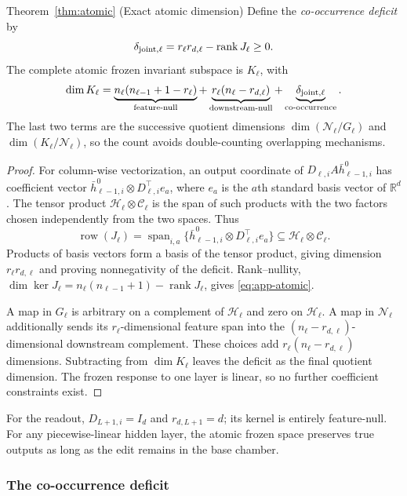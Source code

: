\documentclass[twoside]{article}
\theoremstyle{remark}
\DeclareMathOperator{\rank}{rank}
\DeclareMathOperator{\spanop}{span}
\newcommand{\R}{\mathbb R}
\newcommand{\cC}{\mathcal C}
\newcommand{\cH}{\mathcal H}
\theoremstyle{highlightdefinition}
\theoremstyle{remark}
\newcommand{\spn}{\spanop}
\begin{document}
\begin{restated}{Theorem~\ref{thm:atomic} (Exact atomic dimension)}
Define the \emph{co-occurrence deficit} by
\[
 \delta_{\rm joint,\ell}=r_\ell r_{d,\ell}-\rank J_\ell\ge0.
\]
The complete atomic frozen invariant subspace is $K_\ell$, with
\begin{equation}
 \dim K_\ell=\underbrace{n_\ell(n_{\ell-1}+1-r_\ell)}_{\text{feature-null}}
 +\underbrace{r_\ell(n_\ell-r_{d,\ell})}_{\text{downstream-null}}
 +\underbrace{\delta_{\rm joint,\ell}}_{\text{co-occurrence}}.
\label{eq:app-atomic}
\end{equation}
The last two terms are the successive quotient dimensions
$\dim(\mathcal N_\ell/G_\ell)$ and $\dim(K_\ell/\mathcal N_\ell)$, so the count avoids double-counting overlapping mechanisms.
\end{restated}
\begin{proof}
For column-wise vectorization, an output coordinate of $D_{\ell,i}A\bar h_{\ell-1,i}^0$ has coefficient vector $\bar h_{\ell-1,i}^0\otimes D_{\ell,i}^\top e_a$, where $e_a$ is the $a$th standard basis vector of $\R^d$. The tensor product $\cH_\ell\otimes\cC_\ell$ is the span of such products with the two factors chosen independently from the two spaces. Thus
\[
 \operatorname{row}(J_\ell)
 =\spn_{i,a}\{\bar h_{\ell-1,i}^0\otimes D_{\ell,i}^\top e_a\}
 \subseteq\cH_\ell\otimes\cC_\ell.
\]
Products of basis vectors form a basis of the tensor product, giving dimension $r_\ell r_{d,\ell}$ and proving nonnegativity of the deficit. Rank--nullity, $\dim\ker J_\ell=n_\ell(n_{\ell-1}+1)-\rank J_\ell$, gives \eqref{eq:app-atomic}.

A map in $G_\ell$ is arbitrary on a complement of $\cH_\ell$ and zero on $\cH_\ell$. A map in $\mathcal N_\ell$ additionally sends its $r_\ell$-dimensional feature span into the $(n_\ell-r_{d,\ell})$-dimensional downstream complement. These choices add $r_\ell(n_\ell-r_{d,\ell})$ dimensions. Subtracting from $\dim K_\ell$ leaves the deficit as the final quotient dimension. The frozen response to one layer is linear, so no further coefficient constraints exist.
\end{proof}
For the readout, $D_{L+1,i}=I_d$ and $r_{d,L+1}=d$; its kernel is entirely feature-null. For any piecewise-linear hidden layer, the atomic frozen space preserves true outputs as long as the edit remains in the base chamber.

\subsubsection{The co-occurrence deficit}
\label{app:cooccurrence-deficit}
\end{document}

